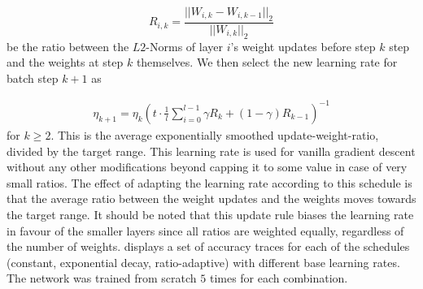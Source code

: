 \begin{equation}
    R_{i,k} = \frac{||W_{i,k} - W_{i,k-1}||_2}{||W_{i,k}||_2}
\end{equation}
be the ratio between the $L2$-Norms of layer $i$'s weight updates before step $k$ step
and the weights at step $k$ themselves.  We then select the new learning rate
for batch step $k+1$ as

\begin{align}
    \eta_{k+1}   = \eta_{k}
                   \left(
                   t \cdot \frac{1}{l}
                   \sum_{i=0}^{l-1} \gamma R_k + (1 - \gamma) R_{k-1}
                   \right)^{-1}
\end{align}
for $k \ge 2$.  This is the average exponentially smoothed update-weight-ratio,
divided by the target range. This learning rate is used for vanilla gradient
descent without any other modifications beyond capping it to some value in case
of very small ratios. The effect of adapting the learning rate according to this
schedule is that the average ratio between the weight updates and the weights
moves towards the target range.  It should be noted that this update rule biases
the learning rate in favour of the smaller layers since all ratios are weighted
equally, regardless of the number of weights.
 displays a set of accuracy traces for each of the
schedules (constant, exponential decay, ratio-adaptive) with different base
learning rates. The network was trained from scratch $5$ times for each combination.

